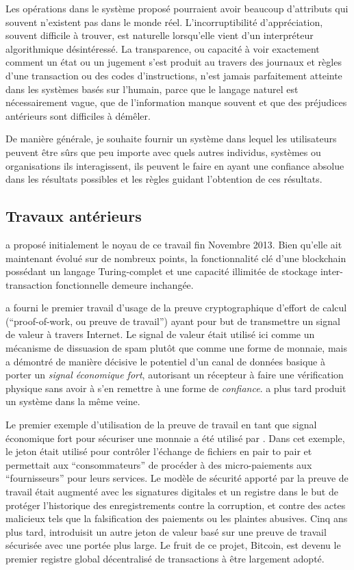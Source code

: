 \documentclass[9pt,oneside]{amsart}
\begin{document}
\begin{multicols}{2}
Les opérations dans le système proposé pourraient avoir beaucoup d'attributs qui souvent n'existent pas dans le monde réel. L'incorruptibilité d'appréciation, souvent difficile à trouver, est naturelle lorsqu'elle vient d'un interpréteur algorithmique désintéressé. La transparence, ou capacité à voir exactement comment un état ou un jugement s'est produit au travers des journaux et règles d'une transaction ou des codes d'instructions, n'est jamais parfaitement atteinte dans les systèmes basés sur l'humain, parce que le langage naturel est nécessairement vague, que de l'information manque souvent et que des préjudices antérieurs sont difficiles à démêler.

De manière générale, je souhaite fournir un système dans lequel les utilisateurs peuvent être sûrs que peu importe avec quels autres individus, systèmes ou organisations ils interagissent, ils peuvent le faire en ayant une confiance absolue dans les résultats possibles et les règles guidant l'obtention de ces résultats.

\subsection{Travaux antérieurs} \label{ch:previous}

\cite{buterin2013ethereum} a proposé initialement le noyau de ce travail fin Novembre 2013. Bien qu'elle ait maintenant évolué sur de nombreux points, la fonctionnalité clé d'une blockchain possédant un langage Turing-complet et une capacité illimitée de stockage inter-transaction fonctionnelle demeure inchangée.

\cite{dwork92pricingvia} a fourni le premier travail d'usage de la preuve cryptographique d’effort de calcul (``proof-of-work, ou preuve de travail'') ayant pour but de transmettre un signal de valeur à travers Internet. Le signal de valeur était utilisé ici comme un mécanisme de dissuasion de spam plutôt que comme une forme de monnaie, mais a démontré de manière décisive le potentiel d'un canal de données basique à porter un \textit{signal économique fort}, autorisant un récepteur à faire une vérification physique sans avoir à s'en remettre à une forme de \textit{confiance}. \cite{back2002hashcash} a plus tard produit un système dans la même veine.

Le premier exemple d'utilisation de la preuve de travail en tant que signal économique fort pour sécuriser une monnaie a été utilisé par \cite{vishnumurthy03karma:a}. Dans cet exemple, le jeton était utilisé pour contrôler l'échange de fichiers en pair to pair et permettait aux ``consommateurs'' de procéder à des micro-paiements aux ``fournisseurs'' pour leurs services. Le modèle de sécurité apporté par la preuve de travail était augmenté avec les signatures digitales et un registre dans le but de protéger l'historique des enregistrements contre la corruption, et contre des actes malicieux tels que la falsification des paiements ou les plaintes abusives. Cinq ans plus tard, \cite{nakamoto2008bitcoin} introduisit un autre jeton de valeur basé sur une preuve de travail sécurisée avec une portée plus large. Le fruit de ce projet, Bitcoin, est devenu le premier registre global décentralisé de transactions à être largement adopté.


\end{multicols}
\end{document}
